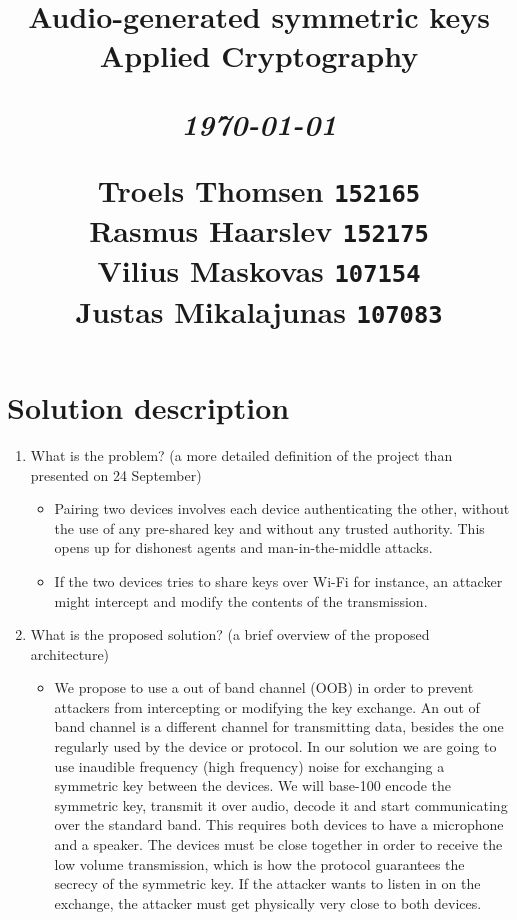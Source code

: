 \documentclass[12pt]{article}
\title{
  \vspace{4cm}
  \begin{flushleft}
  \Large{\textbf{Audio-generated symmetric keys}} \\
  \large{Applied Cryptography}
  \end{flushleft}
  \vspace{0cm}
  \begin{flushleft}
  \small
  \textit{\today}
  \end{flushleft}
  \vspace{12cm}
  \begin{flushleft}
  \small
  Troels Thomsen \texttt{152165} \\
  Rasmus Haarslev \texttt{152175} \\
  Vilius Maskovas \texttt{107154} \\
  Justas Mikalajunas \texttt{107083}\\
  \end{flushleft}
}
\date{
}
\begin{document}
\clearpage
{}
\thispagestyle{empty}
\maketitle

\newpage

\tableofcontents

\newpage


\section{Solution description}
\label{sec:Solution description}

\begin{enumerate}
    \item What is the problem?  (a more detailed definition of the project than presented on 24 September)

    \begin{itemize}
        \item Pairing two devices involves each device authenticating the other, without the use of any pre-shared key and without any trusted authority. This opens up for dishonest agents and man-in-the-middle attacks.
        \item If the two devices tries to share keys over Wi-Fi for instance, an attacker might intercept and modify the contents of the transmission.
    \end{itemize}

    \item What is the proposed solution? (a brief overview of the proposed architecture)

    \begin{itemize}
        \item We propose to use a out of band channel (OOB) in order to prevent attackers from intercepting or modifying the key exchange. An out of band channel is a different channel for transmitting data, besides the one regularly used by the device or protocol. In our solution we are going to use inaudible frequency (high frequency) noise for exchanging a symmetric key between the devices.
        We will base-100 encode the symmetric key, transmit it over audio, decode it and start communicating over the standard band.
        This requires both devices to have a microphone and a speaker.
        The devices must be close together in order to receive the low volume transmission, which is how the protocol guarantees the secrecy of the symmetric key. If the attacker wants to listen in on the exchange, the attacker must get physically very close to both devices.
    \end{itemize}


\end{enumerate}
\end{document}
